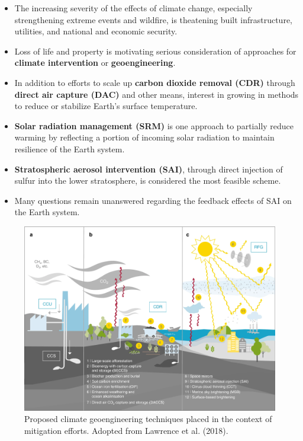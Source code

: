 \begin{itemize}

\item The increasing severity of the effects of climate change, especially strengthening extreme events and wildfire, is theatening built infrastructure, utilities, and national and economic security.

\item Loss of life and property is motivating serious consideration of approaches for \textbf{climate intervention} or \textbf{geoengineering}.

\item In addition to efforts to scale up \textbf{carbon dioxide removal (CDR)} through \textbf{direct air capture (DAC)} and other means, interest in growing in methods to reduce or stabilize Earth's surface temperature.

\item \textbf{Solar radiation management (SRM)} is one approach to partially reduce warming by reflecting a portion of incoming solar radiation to maintain resilience of the Earth system.

\item \textbf{Stratospheric aerosol intervention (SAI)}, through direct injection of sulfur into the lower stratosphere, is considered the most feasible scheme.

\item Many questions remain unanswered regarding the feedback effects of SAI on the Earth system.

\end{itemize}

\begin{figure}
	\begin{center}
		\includegraphics[width=0.8\columnwidth]{figures/41467_2018_5938_Fig1_HTML.png}
	\end{center}
	\caption{Proposed climate geoengineering techniques placed in the context of mitigation efforts. Adopted from Lawrence et al. (2018).
	}
\end{figure}
